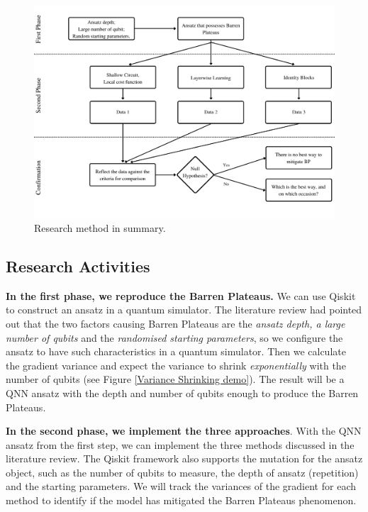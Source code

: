 \begin{figure}
    \centering
    \includegraphics[width=\textwidth]{./ResearchDesign/Appendices/Method.png}
    \caption{
        Research method in summary.
    }
    \label{Research Activities}
\end{figure}

\subsection{Research Activities}

\textbf{In the first phase, we reproduce the Barren Plateaus.} 
We can use Qiskit \cite{Qiskit} to construct an ansatz in a quantum simulator.
The literature review had pointed out that the two factors causing Barren Plateaus are the \textit{ansatz depth, a large number of qubits} and the \textit{randomised starting parameters}, so we configure the ansatz to have such characteristics in a quantum simulator.
Then we calculate the gradient variance and expect the variance to shrink \textit{exponentially} with the number of qubits (see Figure \ref{Variance Shrinking demo}).
The result will be a QNN ansatz with the depth and number of qubits enough to produce the Barren Plateaus.

\textbf{In the second phase, we implement the three approaches}.
With the QNN ansatz from the first step, we can implement the three methods discussed in the literature review.
The Qiskit framework also supports the mutation for the ansatz object, such as the number of qubits to measure, the depth of ansatz (repetition) and the starting parameters.
We will track the variances of the gradient for each method to identify if the model has mitigated the Barren Plateaus phenomenon.

